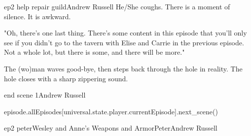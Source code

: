 \documentclass{book}
\begin{document}
\begin{childnode}{ep2 help repair guild}{Andrew Russell}
    He/She coughs. There is a moment of silence. It is awkward.

    "Oh, there's one last thing. There's some content in this episode that you'll only see if you didn't 
    go to the tavern with Elise and Carrie in the previous episode. Not a whole lot, but there is some, and there will be more."

    The (wo)man waves good-bye, then steps back through the hole in reality. The hole closes with a sharp zippering sound.


\end{childnode}

\begin{childnode}{end scene 1}{Andrew Russell}

    \begin{code}

        episode.allEpisodes[universal.state.player.currentEpisode].next\_scene()

    \end{code}

\end{childnode}

\begin{node}{ep2 peter}{Wesley and Anne's Weapons and Armor}{Peter}{Andrew Russell}



\end{node}
\end{document}
